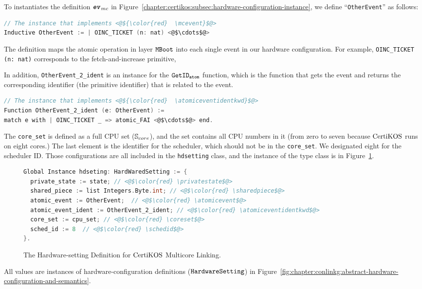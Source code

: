 To instantiates the definition ${{\mathrm{\texttt{\textbf{\textit{ev}}}}}_{mc}}$ in Figure~\ref{chapter:certikos:subsec:hardware-configuration-instance},
we define ``\lstinline$OtherEvent$'' as follows:
\begin{lstlisting}[language=C, deletekeywords={for}]
// The instance that implements <@${\color{red}  \mcevent}$@>
Inductive OtherEvent := | OINC_TICKET (n: nat) <@$\cdots$@> 
\end{lstlisting}
The definition maps the atomic operation in layer ${\mathrm{\texttt{MBoot}}}$ into each single event in our hardware configuration.
For example, \lstinline$OINC_TICKET (n: nat)$ corresponds to the fetch-and-increase primitive,

In addition, \lstinline$OtherEvent_2_ident$ is an instance for the ${{\mathrm{\texttt{GetID}}}_{{\mathrm{\texttt{atom}}}}}$ function, which is the function
that gets the event and returns the corresponding identifier (the primitive identifier) that is related to the event.
\begin{lstlisting}[language=C]
// The instance that implements <@${\color{red}  \atomiceventidentkwd}$@>
Function OtherEvent_2_ident (e: OtherEvent) := 
match e with | OINC_TICKET _ => atomic_FAI <@$\cdots$@> end.
\end{lstlisting}
The \lstinline$core_set$ is defined as a full CPU set (${\mathbb{S}_{core}}$), and 
the set contains all CPU numbers in it (from zero to seven because $\mathrm{CertiKOS}$ runs on eight cores.)
The last element is the identifier for 
the scheduler, which should not be in the \lstinline$core_set$. 
We designated eight for the scheduler ID.
Those configurations are all included in the 
\lstinline$hdsetting$ class, and the instance of the type class
is in Figure~\ref{fig:chapter:ceritkos:instances-of-abstract-hardware-setting}.
\begin{figure}
\begin{lstlisting}[language=C, deletekeywords={int}]
Global Instance hdseting: HardWaredSetting := {
  private_state := state; // <@$\color{red} \privatestate$@>
  shared_piece := list Integers.Byte.int; // <@$\color{red} \sharedpiece$@>
  atomic_event := OtherEvent;  // <@$\color{red} \atomicevent$@>
  atomic_event_ident := OtherEvent_2_ident; // <@$\color{red} \atomiceventidentkwd$@>
  core_set := cpu_set; // <@$\color{red} \coreset$@>
  sched_id := 8  // <@$\color{red} \schedid$@>
}.
\end{lstlisting}
\caption{The Hardware-setting Definition for $\mathrm{CertiKOS}$ Multicore Linking.}
\label{fig:chapter:ceritkos:instances-of-abstract-hardware-setting}
\end{figure}
All values are instances of 
hardware-configuration definitions (${\mathrm{\texttt{HardwareSetting}}}$) in Figure~\ref{fig:chapter:conlinkg:abstract-hardware-configuration-and-semantics}. 

